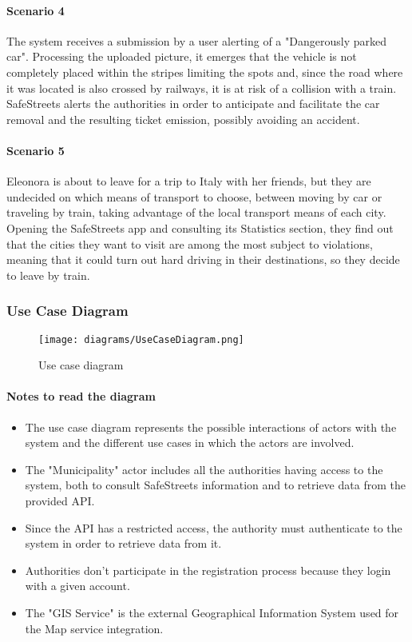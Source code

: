 \paragraph{Scenario 4}
\label{scenario:4}
	The system receives a submission by a user alerting of a "Dangerously parked car". Processing the uploaded picture, it emerges that the vehicle is not completely placed within the stripes limiting the spots and, since the road where it was located is also crossed by railways, it is at risk of a collision with a train. SafeStreets alerts the authorities in order to anticipate and facilitate the car removal and the resulting ticket emission, possibly avoiding an accident.	
	
\paragraph{Scenario 5}
\label{scenario:5}
	Eleonora is about to leave for a trip to Italy with her friends, but they are undecided on which means of transport to choose, between moving by car or traveling by train, taking advantage of the local transport means of each city. Opening the SafeStreets app and consulting its Statistics section, they find out that the cities they want to visit are among the most subject to violations, meaning that it could turn out hard driving in their destinations, so they decide to leave by train.
	
\clearpage

\subsubsection{Use Case Diagram}
	\begin{figure}[h!]
		\centering
		\texttt{[image: diagrams/UseCaseDiagram.png]}
		\caption{
			\label{fig:useCase} 
				Use case diagram
		}
	\end{figure}
	
	\paragraph{Notes to read the diagram}
	\begin{itemize}
		\item The use case diagram represents the possible interactions of actors with the system and the different use cases in which the actors are involved.

		\item The "Municipality" actor includes all the authorities having access to the system, both to consult SafeStreets information and to retrieve data from the provided API.
		
		\item Since the API has a restricted access, the authority must authenticate to the system in order to retrieve data from it.
		
		\item Authorities don't participate in the registration process because they login with a given account.
		
		\item The "GIS Service" is the external Geographical Information System used for the Map service integration.
	\end{itemize}
		

